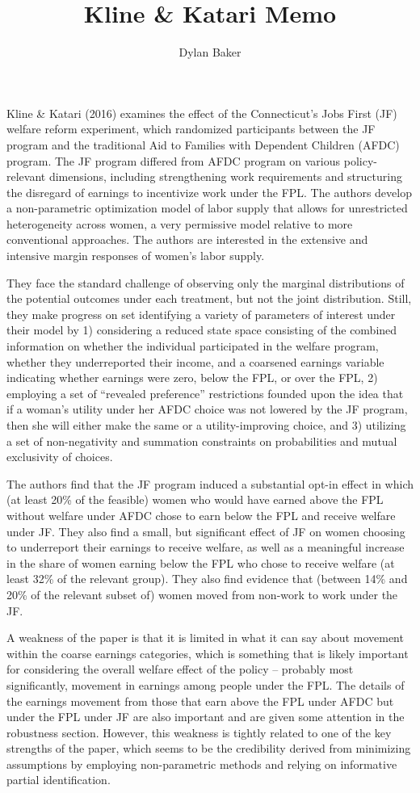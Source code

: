 \documentclass[12pt]{article}
\title{Kline \& Katari Memo}
\author{Dylan Baker}
\begin{document}
Kline \& Katari (2016)
examines the effect of the 
Connecticut's Jobs First (JF)
welfare reform experiment,
which randomized participants between
the JF program and the traditional
Aid to Families with Dependent Children (AFDC)
program. The JF program differed from 
AFDC program on various policy-relevant dimensions,
including strengthening work requirements
and structuring the disregard of earnings 
to incentivize work under the FPL.
The authors develop a non-parametric 
optimization model of labor supply
that allows for unrestricted heterogeneity
across women, a very permissive 
model relative to more conventional approaches.
The authors are interested in the 
extensive and intensive margin responses 
of women's labor supply. 

They face the 
standard challenge of observing 
only the marginal distributions of the potential outcomes
under each treatment, but not the joint distribution.
Still, they make progress on set identifying
a variety of parameters of interest under their model 
by 1) considering a 
reduced state space consisting of the combined information on 
whether the 
individual participated in the welfare program,
whether they underreported their income, and 
a coarsened earnings variable indicating whether 
earnings were zero, below the FPL, or over the FPL,
2) employing a set of 
``revealed preference'' restrictions
founded upon the idea that if a woman's utility 
under her AFDC choice was not lowered by the JF program,
then she will either make the same or a utility-improving 
choice, and 3) utilizing a set of non-negativity and summation
constraints on probabilities and mutual exclusivity of 
choices.

The authors find that the JF program
induced a substantial opt-in effect 
in which (at least 20\% of the feasible) 
women who would have earned 
above the FPL without welfare under AFDC chose to
earn below the FPL and receive 
welfare under JF. They also find a small, but significant
effect of JF on women choosing to underreport their earnings 
to receive welfare, as well as a meaningful increase 
in the share of women earning below the FPL 
who chose to receive welfare (at least 32\% of the 
relevant group). They also find evidence that (between 14\% and 
20\% of the relevant subset of) women 
moved from non-work to work under the JF. 

A weakness of the paper is that it
is limited in what it can say about 
movement within the coarse earnings categories, which is 
something that is likely important for considering the overall
welfare
effect of the policy -- probably most significantly, movement in 
earnings among people under the FPL. The details of the 
earnings movement from those that earn above the FPL 
under AFDC but under the FPL under JF are also important 
and are given some attention in the robustness section.
However, this weakness is 
tightly related to one of the key strengths of the paper,
which seems to be the credibility derived 
from minimizing assumptions by employing 
non-parametric methods and relying on informative 
partial identification.
\end{document}
